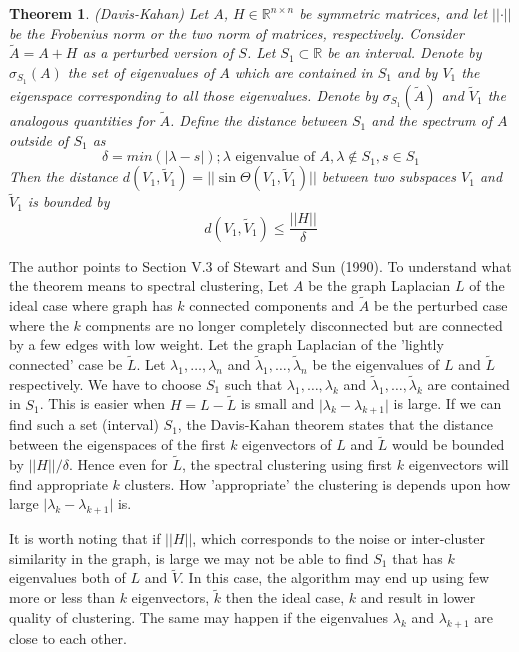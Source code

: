 \documentclass[10pt,a4paper, nocenter]{report}
\newtheorem{theorem}{Theorem}
\newcommand{\abs}[1]{\lvert {#1} \rvert}
\newcommand{\norm}[1]{\lvert\lvert {#1} \rvert\rvert}
\begin{document}
	\begin{theorem} (Davis-Kahan) Let $A$, $H\in\mathbb{R}^{n\times n}$ be symmetric matrices, and let $\norm{\cdot}$ be the Frobenius norm or the two norm of matrices, respectively. Consider $\tilde{A} = A+H$ as a perturbed version of $S$. Let $S_{1} \subset \mathbb{R}$ be an interval. Denote by $\sigma_{S_{1}}(A)$ the set of eigenvalues of $A$ which are contained in $S_{1}$ and by $V_{1}$ the eigenspace corresponding to all those eigenvalues. Denote by $\sigma_{S_{1}}(\tilde{A})$ and $\tilde{V}_{1}$ the analogous quantities for $\tilde{A}$. Define the distance between $S_{1}$ and the spectrum of $A$ outside of $S_{1}$ as $$\delta = min(\abs{\lambda - s}); \lambda\text{ eigenvalue of }A, \lambda\notin S_{1}, s\in S_{1}$$ Then the distance $d(V_{1},\tilde{V}_{1}) =\norm{\sin \Theta(V_{1},\tilde{V}_{1})} $ between two subspaces $V_{1}$ and $\tilde{V}_{1}$ is bounded by $$ d(V_{1},\tilde{V}_{1}) \le \frac{\norm{H}}{\delta} $$
	\end{theorem}

	The author points to Section V.3 of Stewart and Sun (1990)\cite{stewart-sun-1990}. To understand what the theorem means to spectral clustering, Let $A$ be the graph Laplacian $L$ of the ideal case where graph has $k$ connected components and $\tilde{A}$ be the perturbed case where the $k$ compnents are no longer completely disconnected but are connected by a few edges with low weight. Let the graph Laplacian of the 'lightly connected' case be $\tilde{L}$. Let $\lambda_{1},\dots,\lambda_{n}$ and $\tilde{\lambda}_{1},\dots,\tilde{\lambda}_{n}$ be the eigenvalues of $L$ and $\tilde{L}$ respectively. We have to choose $S_{1}$ such that $\lambda_{1},\dots,\lambda_{k}$ and $\tilde{\lambda}_{1},\dots,\tilde{\lambda}_{k}$ are contained in $S_{1}$. This is easier when $H=L-\tilde{L}$ is small and $\abs{\lambda_{k} - \lambda_{k+1}}$ is large. If we can find such a set (interval) $S_{1}$, the Davis-Kahan theorem states that the distance between the eigenspaces of the first $k$ eigenvectors of $L$ and $\tilde{L}$ would be bounded by $\norm{H}/\delta$. Hence even for $\tilde{L}$, the spectral clustering using first $k$ eigenvectors will find appropriate $k$ clusters. How 'appropriate' the clustering is depends upon how large $\abs{\lambda_{k}-\lambda_{k+1}}$ is. 
	
	It is worth noting that if $\norm{H}$, which corresponds to the noise or inter-cluster similarity in the graph, is large we may not be able to find $S_{1}$ that has $k$ eigenvalues both of $L$ and $\tilde{V}$. In this case, the algorithm may end up using few more or less than $k$ eigenvectors, $\tilde{k}$ then the ideal case, $k$ and result in lower quality of clustering. The same may happen if the eigenvalues $\lambda_{k}$ and $\lambda_{k+1}$ are close to each other.
	
\end{document}
